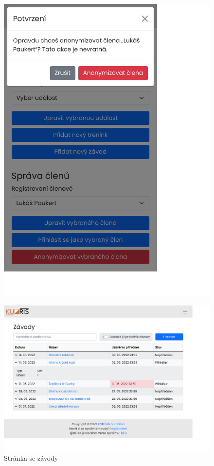\begin{figure}[h]
\begin{minipage}[b]{0.48\linewidth}
        \includegraphics[width=0.99\linewidth, trim={0 1pt 0 0}]{images/appendix-admin-anonymization.pdf}
    \end{minipage}
\end{figure}

\begin{figure}[h]
    \caption{Stránka se závody}
    \centering
    \includegraphics[width=0.995\linewidth, cfbox=kuorisgray 0.5pt 0pt]{images/appendix-races.pdf}
\end{figure}

